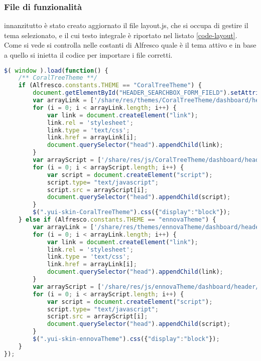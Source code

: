 \subsubsection{File di funzionalità}
innanzitutto è stato creato aggiornato il file layout.js, che si occupa di gestire il tema selezionato, e il cui testo integrale è riportato nel listato \ref{code-layout}. Come si vede si controlla nelle costanti di Alfresco quale è il tema attivo e in base a quello si inietta il codice per importare i file corretti.
\begin{lstlisting}[language=JavaScript, caption=codice di layout.js, label=code-layout]
$( window ).load(function() {
    /** CoralTreeTheme **/
    if (Alfresco.constants.THEME == "CoralTreeTheme") {
        document.getElementById("HEADER_SEARCHBOX_FORM_FIELD").setAttribute("placeholder","Chi cerca, trova!");
        var arrayLink = ['/share/res/themes/CoralTreeTheme/dashboard/header/header.css', '/share/res/themes/CoralTreeTheme/dashboard/footer/footer.css'];
        for (i = 0; i < arrayLink.length; i++) {
            var link = document.createElement("link");
            link.rel = 'stylesheet';
            link.type = 'text/css';
            link.href = arrayLink[i];
            document.querySelector("head").appendChild(link);
        }
        var arrayScript = ['/share/res/js/CoralTreeTheme/dashboard/header/header.js', '/share/res/js/CoralTreeTheme/dashboard/footer/footer.js'];
        for (i = 0; i < arrayScript.length; i++) {
            var script = document.createElement("script");
            script.type= "text/javascript";
            script.src = arrayScript[i];
            document.querySelector("head").appendChild(script);
        }
        $(".yui-skin-CoralTreeTheme").css({"display":"block"});
    } else if (Alfresco.constants.THEME == "ennovaTheme") {
        var arrayLink = ['/share/res/themes/ennovaTheme/dashboard/header/header.css', '/share/res/themes/ennovaTheme/dashboard/footer/footer.css'];
        for (i = 0; i < arrayLink.length; i++) {
            var link = document.createElement("link");
            link.rel = 'stylesheet';
            link.type = 'text/css';
            link.href = arrayLink[i];
            document.querySelector("head").appendChild(link);
        }
        var arrayScript = ['/share/res/js/ennovaTheme/dashboard/header/header.js', '/share/res/js/ennovaTheme/dashboard/footer/footer.js'];
        for (i = 0; i < arrayScript.length; i++) {
            var script = document.createElement("script");
            script.type= "text/javascript";
            script.src = arrayScript[i];
            document.querySelector("head").appendChild(script);
        }
        $(".yui-skin-ennovaTheme").css({"display":"block"});
    }
});
\end{lstlisting}
